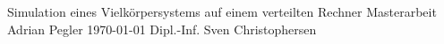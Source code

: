\documentclass[10pt]{book}
\begin{document}
\frontmatter
  \thesistitlepage
    {Simulation eines Vielkörpersystems auf einem verteilten Rechner}
    {Masterarbeit}%
    {Adrian Pegler}%
    {\today}%
    {Dipl.-Inf. Sven Christophersen} %

  \eidesstatt{}
  


  \tableofcontents{}

\mainmatter
















\backmatter
  \tocbibliography
\end{document}
